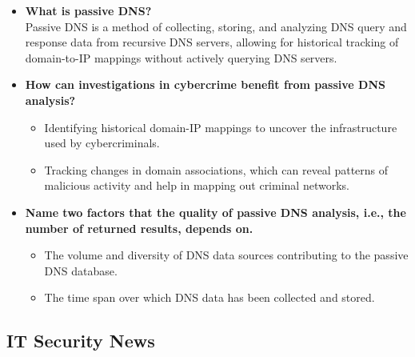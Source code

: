 \documentclass[11pt]{article}
\providecommand{\tightlist}{%
      \setlength{\itemsep}{0pt}\setlength{\parskip}{0pt}}
\begin{document}
\begin{itemize}
\item
  \textbf{What is passive DNS?}\\
  Passive DNS is a method of collecting, storing, and analyzing DNS
  query and response data from recursive DNS servers, allowing for
  historical tracking of domain-to-IP mappings without actively querying
  DNS servers.
\item
  \textbf{How can investigations in cybercrime benefit from passive DNS
  analysis?}

  \begin{itemize}
  \tightlist
  \item
    Identifying historical domain-IP mappings to uncover the
    infrastructure used by cybercriminals.
  \item
    Tracking changes in domain associations, which can reveal patterns
    of malicious activity and help in mapping out criminal networks.
  \end{itemize}
\item
  \textbf{Name two factors that the quality of passive DNS analysis,
  i.e., the number of returned results, depends on.}

  \begin{itemize}
  \tightlist
  \item
    The volume and diversity of DNS data sources contributing to the
    passive DNS database.
  \item
    The time span over which DNS data has been collected and stored.
  \end{itemize}
\end{itemize}

    \hypertarget{it-security-news}{%
\subsection{IT Security News}\label{it-security-news}}
\end{document}
